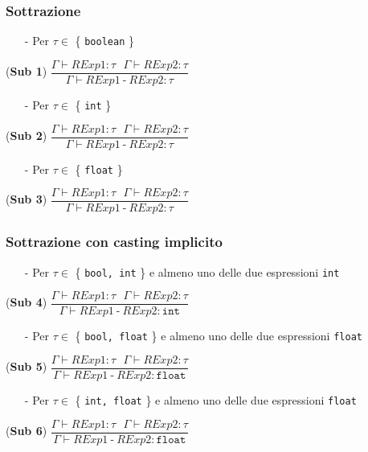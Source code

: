 \documentclass[12pt]{article}
\begin{document}
\subsubsection*{Sottrazione}

\begin{center}

\begin{itemize}
\item[-] Per $\tau \in$ \{ \texttt{boolean} \}
\end{itemize}
\noindent(\textbf{Sub 1})
$\dfrac{\Gamma \vdash RExp1:\tau\ \ \ \Gamma \vdash RExp2:\tau}{\Gamma \vdash RExp1\ \texttt{-}\ RExp2:\tau}$\\[0.1in]

\begin{itemize}
\item[-] Per $\tau \in$ \{ \texttt{int} \}
\end{itemize}
\noindent(\textbf{Sub 2})
$\dfrac{\Gamma \vdash RExp1:\tau\ \ \ \Gamma \vdash RExp2:\tau}{\Gamma \vdash RExp1\ \texttt{-}\ RExp2:\tau}$\\[0.1in]

\begin{itemize}
\item[-] Per $\tau \in$ \{ \texttt{float} \}
\end{itemize}
\noindent(\textbf{Sub 3})
$\dfrac{\Gamma \vdash RExp1:\tau\ \ \ \Gamma \vdash RExp2:\tau}{\Gamma \vdash RExp1\ \texttt{-}\ RExp2:\tau}$\\[0.1in]
\end{center}
\subsubsection*{Sottrazione con casting implicito}
\begin{center}
\begin{itemize}
\item[-] Per $\tau \in$ \{ \texttt{bool, int} \} e almeno uno delle due espressioni \texttt{int}
\end{itemize}
\noindent(\textbf{Sub 4})
$\dfrac{\Gamma \vdash RExp1:\tau\ \ \ \Gamma \vdash RExp2:\tau}{\Gamma \vdash RExp1\ \texttt{-}\ RExp2:\texttt{int}}$\\[0.1in]
\begin{itemize}
\item[-] Per $\tau \in$ \{ \texttt{bool, float} \} e almeno uno delle due espressioni \texttt{float}
\end{itemize}

\noindent(\textbf{Sub 5})
$\dfrac{\Gamma \vdash RExp1:\tau\ \ \ \Gamma \vdash RExp2:\tau}{\Gamma \vdash RExp1\ \texttt{-}\ RExp2:\texttt{float}}$\\[0.1in]
\begin{itemize}
\item[-] Per $\tau \in$ \{ \texttt{int, float} \} e almeno uno delle due espressioni \texttt{float}
\end{itemize}
\noindent(\textbf{Sub 6})
$\dfrac{\Gamma \vdash RExp1:\tau\ \ \ \Gamma \vdash RExp2:\tau}{\Gamma \vdash RExp1\ \texttt{-}\ RExp2:\texttt{float}}$\\[0.1in]
\end{center}
\end{document}
